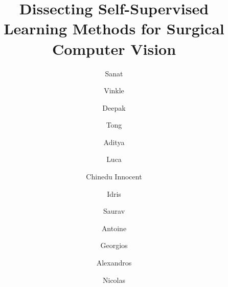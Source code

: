 \documentclass[times,twocolumn,final]{elsarticle}
\begin{document}
\begin{frontmatter}

\title{Dissecting Self-Supervised Learning Methods for Surgical Computer Vision}

\author[1,3]{Sanat }
\author[1]{Vinkle }
\author[1]{Deepak }
\author[1]{Tong }
\author[1]{Aditya }
\author[1,5]{Luca }
\author[1]{Chinedu Innocent }
\author[1]{Idris }
\author[1]{Saurav }
\author[2]{Antoine }
\author[1,2]{Georgios }
\author[1,2]{Alexandros }
\author[1,2]{Nicolas }

\address[1]{ICube, University of Strasbourg, CNRS, Strasbourg 67000, France}
\address[2]{IHU Strasbourg, Strasbourg 67000, France}
\address[3]{Altair Robotics Lab, Department of Computer Science, University of Verona, Verona 37134, Italy}
\address[5]{Department of Electronics, Information and Bioengineering, Politecnico di Milano, Milano 20133, Italy}




\end{frontmatter}
\end{document}
